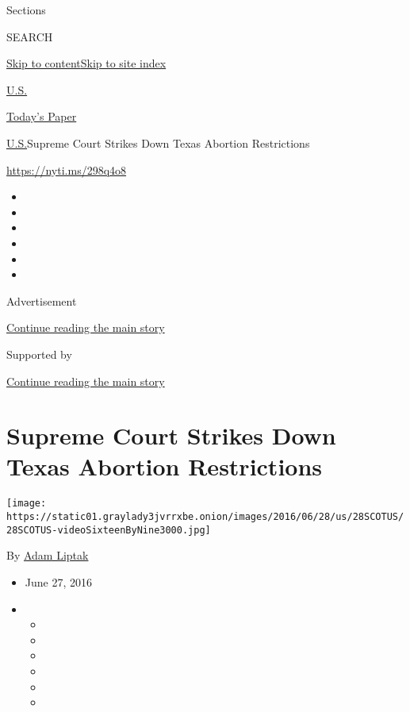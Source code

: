Sections

SEARCH

\protect\hyperlink{site-content}{Skip to
content}\protect\hyperlink{site-index}{Skip to site index}

\href{https://www.nytimes3xbfgragh.onion/section/us}{U.S.}

\href{https://myaccount.nytimes3xbfgragh.onion/auth/login?response_type=cookie\&client_id=vi}{}

\href{https://www.nytimes3xbfgragh.onion/section/todayspaper}{Today's
Paper}

\href{/section/us}{U.S.}\textbar{}Supreme Court Strikes Down Texas
Abortion Restrictions

\url{https://nyti.ms/298q4o8}

\begin{itemize}
\item
\item
\item
\item
\item
\item
\end{itemize}

Advertisement

\protect\hyperlink{after-top}{Continue reading the main story}

Supported by

\protect\hyperlink{after-sponsor}{Continue reading the main story}

\hypertarget{supreme-court-strikes-down-texas-abortion-restrictions}{%
\section{Supreme Court Strikes Down Texas Abortion
Restrictions}\label{supreme-court-strikes-down-texas-abortion-restrictions}}

\texttt{[image: https://static01.graylady3jvrrxbe.onion/images/2016/06/28/us/28SCOTUS/28SCOTUS-videoSixteenByNine3000.jpg]}

By \href{http://www.nytimes3xbfgragh.onion/by/adam-liptak}{Adam Liptak}

\begin{itemize}
\item
  June 27, 2016
\item
  \begin{itemize}
  \item
  \item
  \item
  \item
  \item
  \item
  \end{itemize}
\end{itemize}

